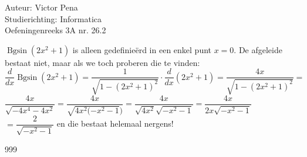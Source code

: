 \documentclass[a4paper]{article}
\begin{document}
	
	\noindent \large Auteur: Victor Pena \\
	\noindent \large Studierichting: Informatica\\
	\noindent \large Oefeningenreeks 3A nr. 26.2\\
	
	\medskip
	
	\normalsize 
	
	$\operatorname{Bgsin}(2x^2+1)$ is alleen gedefinie{\"e}rd in een enkel punt $x=0$. De afgeleide bestaat niet, maar als we toch proberen die te vinden:\\
	
	$\dfrac{d}{dx}\operatorname{Bgsin}\left(2x^2+1\right) = \dfrac{1}{\sqrt{1-(2x^2+1)^2}}\cdot\dfrac{d}{dx}\left(2x^2+1\right)=\dfrac{4x 	}{\sqrt{1-(2x^2+1)^2}} =$ \\
	
	$\dfrac{4x}{\sqrt{-4x^4-4x^2}}=\dfrac{4x}{\sqrt{4x^2(-x^2-1})}=\dfrac{4x}{\sqrt{4x^2}\sqrt{-x^2-1}}=\dfrac{4x}{2x\sqrt{-x^2-1}}$ \\
	
	$ = \dfrac{2}{\sqrt{-x^2-1}} $ en die bestaat helemaal nergens!
	
	
	\begin{thebibliography}{999}
	\end{thebibliography}
\end{document}
